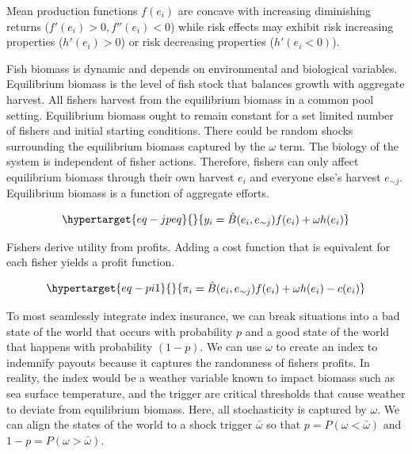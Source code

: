 \documentclass[
  letterpaper,
  DIV=11,
  numbers=noendperiod]{scrartcl}
\theoremstyle{plain}
\theoremstyle{plain}
\theoremstyle{remark}
\begin{document}
Mean production functions \(f(e_i)\) are concave with increasing
diminishing returns (\(f'(e_i)>0,f''(e_i)<0\)) while risk effects may
exhibit risk increasing properties (\(h'(e_i)>0\)) or risk decreasing
properties (\(h'(e_i<0)\)).

Fish biomass is dynamic and depends on environmental and biological
variables. Equilibrium biomass is the level of fish stock that balances
growth with aggregate harvest. All fishers harvest from the equilibrium
biomass in a common pool setting. Equilibrium biomass ought to remain
constant for a set limited number of fishers and initial starting
conditions. There could be random shocks surrounding the equilibrium
biomass captured by the \(\omega\) term. The biology of the system is
independent of fisher actions. Therefore, fishers can only affect
equilibrium biomass through their own harvest \(e_i\) and everyone
else's harvest \(e_{\sim j}\). Equilibrium biomass is a function of
aggregate efforts.

\begin{equation}\protect\hypertarget{eq-jpeq}{}{
\begin{aligned}
y_i=\hat{B}(e_i,e_{\sim j})f(e_i)+\omega h(e_i)
\end{aligned}
}\label{eq-jpeq}\end{equation}

Fishers derive utility from profits. Adding a cost function that is
equivalent for each fisher yields a profit function.

\begin{equation}\protect\hypertarget{eq-pi1}{}{
\begin{aligned}
\pi_i=\hat{B}(e_i,e_{\sim j})f(e_i)+\omega h(e_i)-c(e_i)
\end{aligned}
}\label{eq-pi1}\end{equation}

To most seamlessly integrate index insurance, we can break situations
into a bad state of the world that occurs with probability \(p\) and a
good state of the world that happens with probability \((1-p)\). We can
use \(\omega\) to create an index to indemnify payouts because it
captures the randomness of fishers profits. In reality, the index would
be a weather variable known to impact biomass such as sea surface
temperature, and the trigger are critical thresholds that cause weather
to deviate from equilibrium biomass. Here, all stochasticity is captured
by \(\omega\). We can align the states of the world to a shock trigger
\(\bar\omega\) so that \(p=P(\omega<\bar\omega)\) and
\(1-p=P(\omega>\bar\omega)\).
\end{document}
